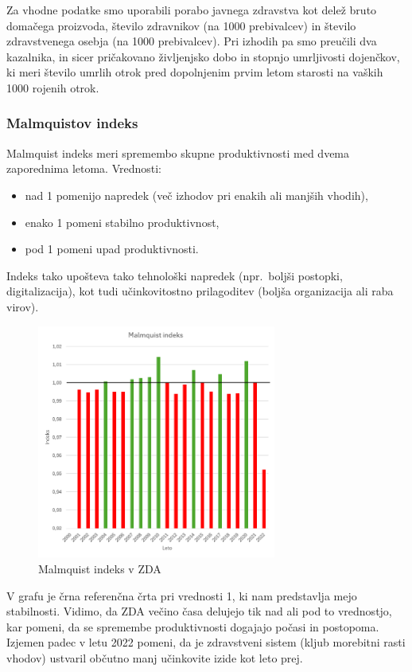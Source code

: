 \documentclass[12pt,a4paper]{article}
\theoremstyle{definition}
\begin{document}
Za vhodne podatke smo uporabili porabo javnega zdravstva kot delež bruto domačega proizvoda, 
število zdravnikov (na 1000 prebivalcev) in število zdravstvenega osebja (na 1000 prebivalcev). 
Pri izhodih pa smo preučili dva kazalnika, in sicer pričakovano življenjsko dobo in stopnjo umrljivosti dojenčkov, 
ki meri število umrlih otrok pred dopolnjenim prvim letom starosti na vaških 1000 rojenih otrok.

\subsubsection{Malmquistov indeks}

Malmquist indeks meri spremembo skupne produktivnosti med dvema zaporednima letoma. Vrednosti:
\begin{itemize}
    \item nad 1 pomenijo napredek (več izhodov pri enakih ali manjših vhodih),
    \item enako 1 pomeni stabilno produktivnost,
    \item pod 1 pomeni upad produktivnosti.
\end{itemize}
Indeks tako upošteva tako tehnološki napredek (npr.\ boljši postopki, digitalizacija),
kot tudi učinkovitostno prilagoditev (boljša organizacija ali raba virov).

\begin{figure}[H]
    \centering
    \includegraphics[width=0.7\textwidth]{zda_malmquist_indeks.png}
    \caption{Malmquist indeks v ZDA}
    \label{fig:zda_malmquist_indeks}
\end{figure}

V grafu je črna referenčna črta pri vrednosti 1, ki nam predstavlja mejo stabilnosti. 
Vidimo, da ZDA večino časa delujejo tik nad ali pod to vrednostjo, kar pomeni, 
da se spremembe produktivnosti dogajajo počasi in postopoma. 
Izjemen padec v letu 2022 pomeni, da je zdravstveni sistem (kljub morebitni rasti vhodov) 
ustvaril občutno manj učinkovite izide kot leto prej.
\end{document}
